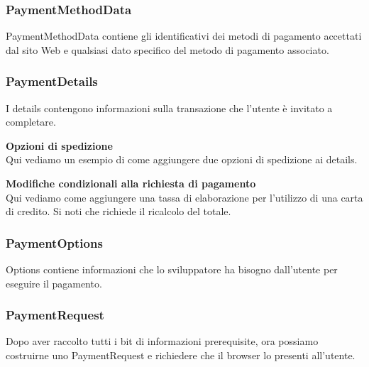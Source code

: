 \documentclass[11pt ,a4paper , twoside , openright ]{article}
\begin{document}
	\pagebreak
	\subsubsection{PaymentMethodData}
	PaymentMethodData contiene gli identificativi dei metodi di pagamento accettati dal sito Web e qualsiasi dato specifico del metodo di pagamento associato.
	
	\subsubsection{PaymentDetails}
	I details contengono informazioni sulla transazione che l'utente è invitato a completare.
	
	\pagebreak
	\textbf{Opzioni di spedizione}
	\\
	Qui vediamo un esempio di come aggiungere due opzioni di spedizione ai details.
	
	
	\flushleft\textbf{Modifiche condizionali alla richiesta di pagamento}
	\\
	Qui vediamo come aggiungere una tassa di elaborazione per l'utilizzo di una carta di credito. Si noti che richiede il ricalcolo del totale.
	
	\pagebreak
	\subsubsection{PaymentOptions}
	Options contiene informazioni che lo sviluppatore ha bisogno dall'utente per eseguire il pagamento.
	
	
	
	\subsubsection{PaymentRequest}
	Dopo aver raccolto tutti i bit di informazioni prerequisite, ora possiamo costruirne uno PaymentRequest e richiedere che il browser lo presenti all'utente.
	
	\newpage
\end{document}
